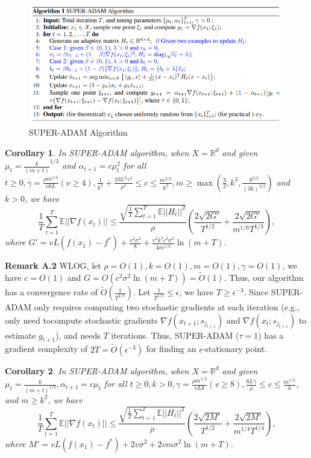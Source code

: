 \documentclass{article}
\newtheorem{corollary}{Corollary}[section]
\begin{document}
\begin{figure}[h]
	\label{fig2}
	\centering
	\includegraphics[scale = 0.5]{super-adam-algo.png}
	\caption{SUPER-ADAM Algorithm}
\end{figure}
\begin{corollary}
	\label{coro61appendix}
	In SUPER-ADAM algorithm, when $X=\mathbb{R}^d$ and given $\mu_t = \frac{k}{(m+t)}^{1/3}$ and $\alpha_{t+1} = c\mu^2_t$ for all $t\geq 0, \gamma = \frac{\rho m^{1/3}}{vkL}(v\geq 4), \frac{1}{k^3} + \frac{10L^2 \gamma^2}{\rho^2}\leq c \leq \frac{m^{2/3}}{k^2},
	m\geq\max(\frac{3}{2}, k^3, \frac{8^{3/2}}{(3k)^{3/2}})$ and $k > 0$, we have
	\begin{equation}
		\frac{1}{T}\sum^T_{t=1}\mathbb{E}||\nabla f(x_t)||\leq
		\frac{\sqrt{\frac{1}{T}\sum^T_{t=1}\mathbb{E}||H_t||^2}}{\rho}
		\left(\frac{2\sqrt{2G'}}{T^{1/2}} + \frac{2\sqrt{2G'}}{m^{1/6}T^{1/3}}\right),
	\end{equation}
	where $G'=vL(f(x_1) - f^*) + \frac{v^2 \sigma^2}{8} + \frac{v^2 k^4 c^2 \sigma^2}{4m^{1/3}}\ln(m+T)$.
\end{corollary}
\textbf{Remark A.2} WLOG, let $\rho = O(1), k = O(1), m = O(1), \gamma = O(1)$, we have $c=O(1)$ and $G = O(c^2 \sigma^2 \ln(m+T)) = \tilde{O}(1)$. Thus, our algorithm has a convergence rate of $\tilde{O}\left(\frac{1}{T^{1/3}}\right)$.
Let $\frac{1}{T^{1/3}}\leq \epsilon$, we have $T\geq \epsilon^{-3}$. Since SUPER-ADAM only requires computing two stochastic gradients at each iteration (e.g., only need tocompute stochastic gradients $\nabla f(x_{t+1}; s_{j_{t+1}})$
and $\nabla f(x_t; s_{j_{t+1}})$ to estimate $g_{t+1}$), and needs $T$ iterations. Thus, SUPER-ADAM ($\tau = 1$) has a gradient complexity of $2T = \tilde{O}(\epsilon^{-3})$ for finding an $\epsilon$-stationary point.
\begin{corollary}
	\label{coro62appendix}
	In SUPER-ADAM algorithm, when $X=\mathbb{R}^d$ and given $\mu_t = \frac{k}{(m+t)^{1/2}}, \alpha_{t+1} = c\mu_t$ for all $t\geq 0, k > 0, \gamma = \frac{\rho m^{1/2}}{vLk}(v\geq 8), \frac{8L\gamma}{\rho}\leq c \leq \frac{m^{1/2}}{k}$, and $m\geq k^2$, we haev
	\begin{equation}
		\frac{1}{T}\sum^T_{t=1}\mathbb{E}||\nabla f(x_t)||\leq
		\frac{\sqrt{\frac{1}{T}\sum^T_{t=1}\mathbb{E}||H_t||^2}}{\rho}
		\left(\frac{2\sqrt{2M'}}{T^{1/2}} + \frac{2\sqrt{2M'}}{m^{1/4}T^{1/4}}\right),
	\end{equation}
	where $M'=vL(f(x_1) - f^*) + 2v\sigma^2 + 2vm\sigma^2 \ln(m+T)$.
\end{corollary}
\end{document}

